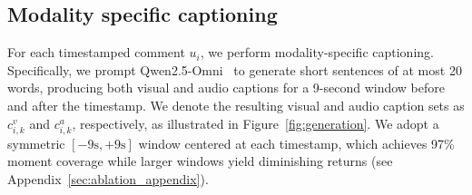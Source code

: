 \documentclass[11pt]{article}
\newcommand{\figref}[1]{Figure~\ref{#1}}
\begin{document}
\subsection{Modality specific captioning}
\vspace{+.5em}
For each timestamped comment $u_i$, we perform modality-specific captioning.
Specifically, we prompt Qwen2.5-Omni~\cite{qwen2.5omni} to generate short sentences of at most 20 words, producing both visual and audio captions for a 9-second window before and after the timestamp.
We denote the resulting visual and audio caption sets as ${c_{i,k}^v}$ and  ${c_{i,k}^a}$, respectively, as illustrated in \figref{fig:generation}.
We adopt a symmetric $[-9\mathrm{s}, +9\mathrm{s}]$ window centered at each timestamp, which achieves 97\% moment coverage while larger windows yield diminishing returns (see Appendix~\ref{sec:ablation_appendix}).  
          
\end{document}

